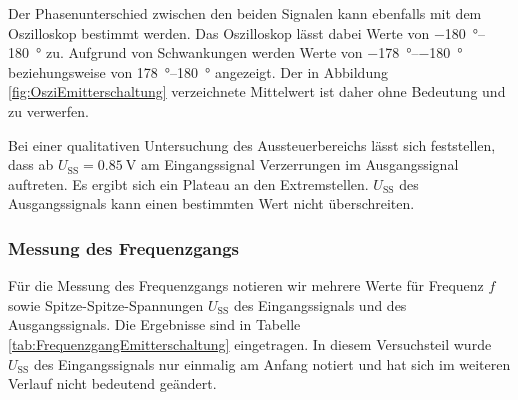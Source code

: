 \endminipage
%
\par
%
Der Phasenunterschied zwischen den beiden Signalen kann ebenfalls mit dem Oszilloskop bestimmt werden.
Das Oszilloskop lässt dabei Werte von \SIrange{-180}{180}{\degree} zu.
Aufgrund von Schwankungen werden Werte von \SIrange{-178}{-180}{\degree} beziehungsweise von \SIrange{178}{180}{\degree} angezeigt.
Der in Abbildung \ref{fig:OsziEmitterschaltung} verzeichnete Mittelwert ist daher ohne Bedeutung und zu verwerfen.
%
\par
%
Bei einer qualitativen Untersuchung des Aussteuerbereichs lässt sich feststellen, dass ab $U_{\text{SS}} = \SI{0,85}{\volt}$ am Eingangssignal Verzerrungen im Ausgangssignal auftreten.
Es ergibt sich ein Plateau an den Extremstellen.
$U_{\text{SS}}$ des Ausgangssignals kann einen bestimmten Wert nicht überschreiten.
%
\subsubsection*{Messung des Frequenzgangs}
%
Für die Messung des Frequenzgangs notieren wir mehrere Werte für Frequenz $f$ sowie Spitze-Spitze-Spannungen $U_{\text{SS}}$ des Eingangssignals und des Ausgangssignals.
Die Ergebnisse sind in Tabelle \ref{tab:FrequenzgangEmitterschaltung} eingetragen.
In diesem Versuchsteil wurde $U_{\text{SS}}$ des Eingangssignals nur einmalig am Anfang notiert und hat sich im weiteren Verlauf nicht bedeutend geändert.
%
\par
%
\minipage{\linewidth}
